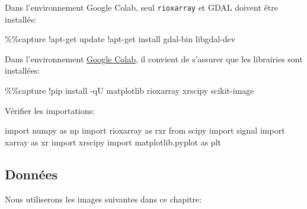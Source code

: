 \documentclass[
  french,
  11pt,
  letterpaper,
  open=any,
  twoside=false,
  french]{scrbook}
\newenvironment{Shaded}{\begin{snugshade}}{\end{snugshade}}
\newcommand{\BuiltInTok}[1]{\textcolor[rgb]{0.00,0.23,0.31}{#1}}
\newcommand{\ImportTok}[1]{\textcolor[rgb]{0.00,0.46,0.62}{#1}}
\newcommand{\NormalTok}[1]{\textcolor[rgb]{0.00,0.23,0.31}{#1}}
\newcommand{\OperatorTok}[1]{\textcolor[rgb]{0.37,0.37,0.37}{#1}}
\begin{document}
Dans l'environnement Google Colab, seul \texttt{rioxarray} et GDAL
doivent être installés:

\begin{Shaded}
\begin{Highlighting}[]
\OperatorTok{\%\%}\NormalTok{capture}
\OperatorTok{!}\NormalTok{apt}\OperatorTok{{-}}\NormalTok{get update}
\OperatorTok{!}\NormalTok{apt}\OperatorTok{{-}}\NormalTok{get install gdal}\OperatorTok{{-}}\BuiltInTok{bin}\NormalTok{ libgdal}\OperatorTok{{-}}\NormalTok{dev}
\end{Highlighting}
\end{Shaded}

Dans l'environnement \href{https://colab.research.google.com/}{Google
Colab}, il convient de s'assurer que les librairies sont installées:

\begin{Shaded}
\begin{Highlighting}[]
\OperatorTok{\%\%}\NormalTok{capture}
\OperatorTok{!}\NormalTok{pip install }\OperatorTok{{-}}\NormalTok{qU matplotlib rioxarray xrscipy scikit}\OperatorTok{{-}}\NormalTok{image}
\end{Highlighting}
\end{Shaded}

Vérifier les importations:

\begin{Shaded}
\begin{Highlighting}[]
\ImportTok{import}\NormalTok{ numpy }\ImportTok{as}\NormalTok{ np}
\ImportTok{import}\NormalTok{ rioxarray }\ImportTok{as}\NormalTok{ rxr}
\ImportTok{from}\NormalTok{ scipy }\ImportTok{import}\NormalTok{ signal}
\ImportTok{import}\NormalTok{ xarray }\ImportTok{as}\NormalTok{ xr}
\ImportTok{import}\NormalTok{ xrscipy}
\ImportTok{import}\NormalTok{ matplotlib.pyplot }\ImportTok{as}\NormalTok{ plt}
\end{Highlighting}
\end{Shaded}

\subsection{Données}\label{donnuxe9es-1}

Nous utiliserons les images suivantes dans ce chapitre:
\end{document}

